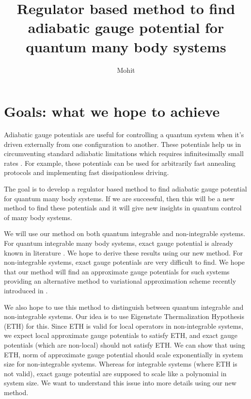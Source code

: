 \documentclass[11pt,a4paper]{article}
\author{Mohit}
\title{Regulator based method to find adiabatic gauge potential for quantum many body systems }
\begin{document}
\maketitle
 \tableofcontents
\section{Goals: what we hope to achieve}


Adiabatic gauge potentials are useful for controlling a quantum system when it's driven externally from one configuration to another. These potentials help us in  circumventing standard adiabatic limitations which requires infinitesimally small rates \cite{demirplak2003adiabatic,demirplak2005assisted, berry2009transitionless}. For example, these potentials can be used for arbitrarily fast annealing protocols and implementing fast dissipationless driving. 


The goal is to develop a regulator based method to find adiabatic gauge potential for quantum many body systems. If we are successful, then this will be a new method to find these potentials and it will give new insights in quantum control of many body systems. 

We will use our method on both quantum integrable and non-integrable systems. For quantum integrable many body systems, exact gauge potential is already known in literature \cite{del2012assisted, kolodrubetz2016geometry}. We hope to derive these results using our new method. For non-integrable systems, exact gauge potentials are very difficult to find. We hope that our method will find an approximate gauge potentials for such systems providing an alternative method to variational approximation scheme recently introduced in \cite{del2012assisted}.

We also hope to use this method to distinguish between quantum integrable and non-integrable systems. Our idea is to use  Eigenstate Thermalization Hypothesis (ETH)\cite{d2016quantum} for this. Since ETH is valid for local operators in non-integrable systems, we expect local approximate gauge potentials to satisfy ETH, and exact gauge potentials (which are non-local) should not satisfy ETH. We can show that  using ETH, norm of approximate gauge potential should scale exponentially in system size for non-integrable systems. Whereas for integrable systems (where ETH is not valid), exact gauge potential are supposed to scale like a polynomial in system size. We want to understand this issue into more details using our new method.
\end{document}
